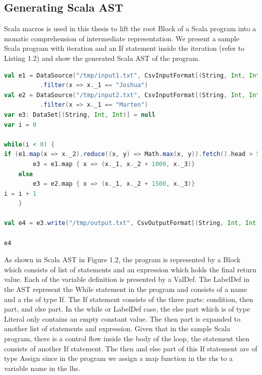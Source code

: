 \subsection{Generating Scala AST}
Scala macros is used in this thesis to lift the root Block of a Scala program into a monatic comprehension of intermediate representation. We present a sample Scala program with iteration and an If statement inside the iteration (refer to Listing 1.2) and show the generated Scala AST of the program. 
\\
\begin{lstlisting}[language=scala, caption=Workflow with Conditional, label = workflow2]
val e1 = DataSource("/tmp/input1.txt", CsvInputFormat[(String, Int, Int)]())
          .filter(x => x._1 == "Joshua")
val e2 = DataSource("/tmp/input2.txt", CsvInputFormat[(String, Int, Int)]())
          .filter(x => x._1 == "Marten")
var e3: DataSet[(String, Int, Int)] = null
var i = 0

while(i < 0) {
if (e1.map(x => x._2).reduce((x, y) => Math.max(x, y)).fetch().head > 50)
        e3 = e1.map { x => (x._1, x._2 + 1000, x._3)}
    else
    	e3 = e2.map { x => (x._1, x._2 + 1500, x._3)}
i = i + 1
    }

val e4 = e3.write("/tmp/output.txt", CsvOutputFormat[(String, Int, Int)]())

e4
\end{lstlisting}

As shown in Scala AST in Figure 1.2, the program is represented by a Block which consists of list of statements and an expression which holds the final return value. Each of the variable definition is presented by a ValDef. The LabelDef in the AST represent the While statement in the program and consists of a name and a rhs of type If. The If statement consists of the three parts: condition, then part, and else part. In the while or LabelDef case, the else part which is of type Literal only contains an empty constant value. The then part is expanded to another list of statements and expression. Given that in the sample Scala program, there is a control flow inside the body of the loop, the statement then consists of another If statement. The then and else part of this If statement are of type Assign since in the program we assign a map function in the rhs to a variable name in the lhs. 

